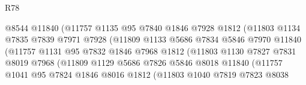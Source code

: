 \begin{lexlean}{R78}
\begin{coremodule}
                                  @8544
                                  @11840
                                  (@11757
                                    @1135
                                    @95
                                    @7840
                                    @1846
                                    @7928
                                    @1812
                                    (@11803
                                      @1134
                                      @7835
                                      @7839
                                      @7971
                                      @7928
                                      (@11809
                                        @1133
                                        @5686
                                        @7834
                                        @5846
                                        @7970
                                        @11840
                                        (@11757
                                          @1131
                                          @95
                                          @7832
                                          @1846
                                          @7968
                                          @1812
                                          (@11803
                                            @1130
                                            @7827
                                            @7831
                                            @8019
                                            @7968
                                            (@11809
                                              @1129
                                              @5686
                                              @7826
                                              @5846
                                              @8018
                                              @11840
                                              (@11757
                                                @1041
                                                @95
                                                @7824
                                                @1846
                                                @8016
                                                @1812
                                                (@11803
                                                  @1040
                                                  @7819
                                                  @7823
                                                  @8038

\end{coremodule}
\end{lexlean}
